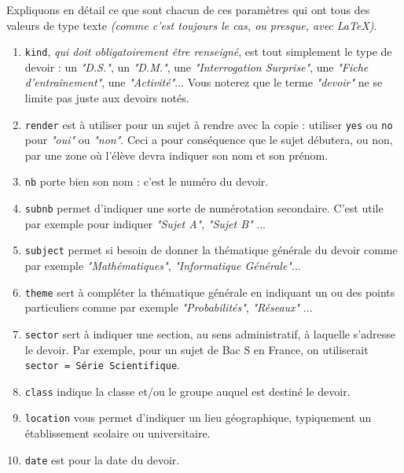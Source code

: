 \documentclass[12pt,a4paper]{article}
\theoremstyle{definition}
\begin{document}
Expliquons en détail ce que sont chacun de ces paramètres qui ont tous des valeurs de type texte \emph{(comme c'est toujours le cas, ou presque, avec \LaTeX{})}.

\begin{enumerate}
	\item \verb+kind+, \emph{qui doit obligatoirement être renseigné}, est tout simplement le type de devoir : un \emph{"D.S."}, un \emph{"D.M."}, une \emph{"Interrogation Surprise"}, une \emph{"Fiche d'entraînement"}, une \emph{"Activité"}...
	Vous noterez que le terme \emph{"devoir"} ne se limite pas juste aux devoirs notés.

	\item \verb+render+ est à utiliser pour un sujet à rendre avec la copie : utiliser \verb+yes+ ou \verb+no+ pour \emph{"oui"} ou \emph{"non"}.
	Ceci a pour conséquence que le sujet débutera, ou non, par une zone où l'élève devra indiquer son nom et son prénom.

	\item \verb+nb+ porte bien son nom : c'est le numéro du devoir.

	\item \verb+subnb+ permet d'indiquer une sorte de numérotation secondaire. C'est utile par exemple pour indiquer \emph{"Sujet A"}, \emph{"Sujet B"} ...

	\item \verb+subject+ permet si besoin de donner la thématique générale du devoir comme par exemple \emph{"Mathématiques"}, \emph{"Informatique Générale"}...

	\item \verb+theme+ sert à compléter la thématique générale en indiquant un ou des points particuliers comme par exemple \emph{"Probabilités"}, \emph{"Réseaux"} ...

	\item \verb+sector+ sert à indiquer une section, au sens administratif, à laquelle s'adresse le devoir. Par exemple, pour un sujet de Bac S en France, on utiliserait \verb+sector = Série Scientifique+.

	\item \verb+class+ indique la classe et/ou le groupe auquel est destiné le devoir.

	\item \verb+location+ vous permet d'indiquer un lieu géographique, typiquement un établissement scolaire ou universitaire.

	\item \verb+date+ est pour la date du devoir.


\end{enumerate}
\end{document}
